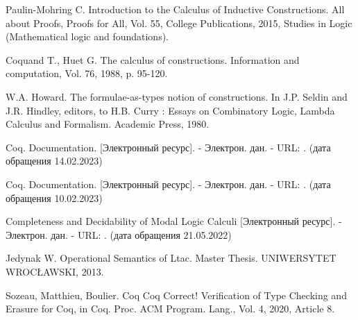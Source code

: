 \documentclass[12pt]{article}
\begin{document}
\begin{thebibliography}{99}
     Paulin-Mohring C. Introduction to the Calculus of Inductive Constructions. All about Proofs, Proofs for All, Vol. 55, College Publications, 2015, Studies
in Logic (Mathematical logic and foundations).

     Coquand T., Huet G. The calculus of constructions.
    Information and computation, Vol. 76, 1988, p. 95-120.
    
     W.A. Howard. The formulae-as-types notion of constructions. In J.P. Seldin and J.R. Hindley, editors, to H.B. Curry : Essays on Combinatory Logic, Lambda Calculus and Formalism. Academic Press, 1980.

     Coq. Documentation. [Электронный ресурс]. - Электрон. дан. - URL: . (дата обращения 14.02.2023) 
    
    
    


     
    
    
    
    
    

    

    
    
     Coq. Documentation. [Электронный ресурс]. - Электрон. дан. - URL: . (дата обращения 10.02.2023)

     Completeness and Decidability of Modal Logic Calculi [Электронный ресурс]. - Электрон. дан. - URL: . (дата обращения 21.05.2022)

     Jedynak W. Operational Semantics of Ltac. Master Thesis. UNIWERSYTET WROCŁAWSKI, 2013.
    
     Sozeau, Matthieu, Boulier. Coq Coq Correct! Verification of Type Checking and Erasure for Coq, in Coq. Proc. ACM Program. Lang., Vol. 4, 2020, Article 8.
  \end{thebibliography}




  
\end{document}
